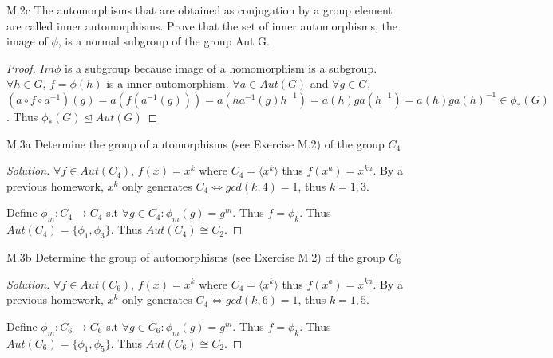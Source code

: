 \documentclass{article}
\newenvironment{solution}
{\renewcommand\qedsymbol{$\blacksquare$}\begin{proof}[Solution]}
{\end{proof}}
\begin{document}
\begin{PROB}{M.2c}\label{Problem M.2c.}
    The automorphisms that are obtained as conjugation by a group element are called inner automorphisms. Prove that the set of inner automorphisms, the image of $\phi$, is a normal subgroup of the group Aut G.
\end{PROB}
\begin{proof}
    $Im \phi$ is a subgroup because image of a homomorphism is a subgroup. $\forall h \in G$, $f = \phi(h)$ is a inner automorphism. $\forall a \in Aut(G)$ and $\forall g \in G$, $(a \circ f \circ a^{-1})(g) = a(f(a^{-1}(g))) = a(ha^{-1}(g)h^{-1}) = a(h)ga(h^{-1}) = a(h)ga(h)^{-1} \in \phi_*(G)$. Thus $\phi_*(G) \trianglelefteq Aut(G)$
\end{proof}

\bigskip

\begin{PROB}{M.3a}\label{Problem M.3a.}
    Determine the group of automorphisms (see Exercise M.2) of the group $C_4$
\end{PROB}
\begin{solution}
    $\forall f \in Aut(C_4)$, $f(x) = x^k$ where $C_4 = \langle x^k \rangle$ thus $f(x^a) = x^{ka}$. By a previous homework, $x^k$ only generates $C_4 \iff gcd(k, 4) = 1$, thus $k = 1, 3$. 
    
    Define $\phi_m: C_4 \to C_4$ s.t $\forall g \in C_4: \phi_m(g) = g^m$. Thus $f = \phi_k$. Thus $Aut(C_4) = \{\phi_{1}, \phi_{3}\}$. Thus $Aut(C_4) \cong C_2$. 
\end{solution}

\begin{PROB}{M.3b}\label{Problem M.3b.}
    Determine the group of automorphisms (see Exercise M.2) of the group $C_6$
\end{PROB}
\begin{solution}
    $\forall f \in Aut(C_6)$, $f(x) = x^k$ where $C_4 = \langle x^k \rangle$ thus $f(x^a) = x^{ka}$. By a previous homework, $x^k$ only generates $C_4 \iff gcd(k, 6) = 1$, thus $k = 1, 5$. 
    
    Define $\phi_m: C_6 \to C_6$ s.t $\forall g \in C_6: \phi_m(g) = g^m$. Thus $f = \phi_k$. Thus $Aut(C_6) = \{\phi_{1}, \phi_{5}\}$. Thus $Aut(C_6) \cong C_2$. 
\end{solution}
\end{document}
